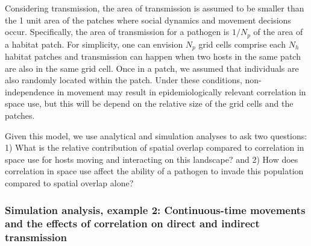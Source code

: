 ﻿\documentclass[11pt]{article}
\begin{document}
Considering transmission, the area of transmission is assumed to be smaller than the 1 unit area of the patches where social dynamics and movement decisions occur. Specifically, the area of transmission for a pathogen is $1 / N_p$ of the area of a habitat patch.  For simplicity, one can envision $N_p$ grid cells comprise each $N_h$ habitat patches and transmission can happen when two hosts in the same patch are also in the same grid cell. Once in a patch, we assumed that individuals are also randomly located within the patch. Under these conditions, non-independence in movement may result in epidemiologically relevant correlation in space use, but this will be depend on the relative size of the grid cells and the patches. 

Given this model, we use analytical and simulation analyses to ask two questions:  1) What is the relative contribution of spatial overlap compared to correlation in space use for hosts moving and interacting on this landscape? and 2) How does correlation in space use affect the ability of a pathogen to invade this population compared to spatial overlap alone?

\subsubsection*{Simulation analysis, example 2: Continuous-time movements and the effects of correlation on direct and indirect transmission}
\end{document}
